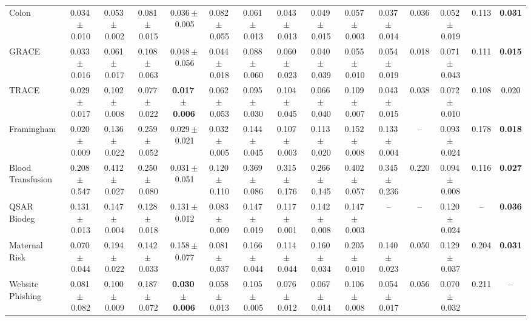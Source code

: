 \documentclass[8pt]{extarticle}
\begin{document}
\begin{longtable}{l*{14}{c}}
Colon & 0.034\,$\pm$\,0.010 & 0.053\,$\pm$\,0.002 & 0.081\,$\pm$\,0.015 & 0.036\,$\pm$\,0.005 & 0.082\,$\pm$\,0.055 & 0.061\,$\pm$\,0.013 & 0.043\,$\pm$\,0.013 & 0.049\,$\pm$\,0.015 & 0.057\,$\pm$\,0.003 & 0.037\,$\pm$\,0.014 & 0.036 & 0.052\,$\pm$\,0.019 & 0.113 & \textbf{0.031} \\
GRACE & 0.033\,$\pm$\,0.016 & 0.061\,$\pm$\,0.017 & 0.108\,$\pm$\,0.063 & 0.048\,$\pm$\,0.056 & 0.044\,$\pm$\,0.018 & 0.088\,$\pm$\,0.060 & 0.060\,$\pm$\,0.023 & 0.040\,$\pm$\,0.039 & 0.055\,$\pm$\,0.010 & 0.054\,$\pm$\,0.019 & 0.018 & 0.071\,$\pm$\,0.043 & 0.111 & \textbf{0.015} \\
TRACE & 0.029\,$\pm$\,0.017 & 0.102\,$\pm$\,0.008 & 0.077\,$\pm$\,0.022 & \textbf{0.017\,$\pm$\,0.006} & 0.062\,$\pm$\,0.053 & 0.095\,$\pm$\,0.030 & 0.104\,$\pm$\,0.045 & 0.066\,$\pm$\,0.040 & 0.109\,$\pm$\,0.007 & 0.043\,$\pm$\,0.015 & 0.038 & 0.072\,$\pm$\,0.010 & 0.108 & 0.020 \\
Framingham & 0.020\,$\pm$\,0.009 & 0.136\,$\pm$\,0.022 & 0.259\,$\pm$\,0.052 & 0.029\,$\pm$\,0.021 & 0.032\,$\pm$\,0.005 & 0.144\,$\pm$\,0.045 & 0.107\,$\pm$\,0.003 & 0.113\,$\pm$\,0.020 & 0.152\,$\pm$\,0.008 & 0.133\,$\pm$\,0.004 & -- & 0.093\,$\pm$\,0.024 & 0.178 & \textbf{0.018} \\
Blood Transfusion & 0.208\,$\pm$\,0.547 & 0.412\,$\pm$\,0.027 & 0.250\,$\pm$\,0.080 & 0.031\,$\pm$\,0.051 & 0.120\,$\pm$\,0.110 & 0.369\,$\pm$\,0.086 & 0.315\,$\pm$\,0.176 & 0.266\,$\pm$\,0.145 & 0.402\,$\pm$\,0.057 & 0.345\,$\pm$\,0.236 & 0.220 & 0.094\,$\pm$\,0.008 & 0.116 & \textbf{0.027} \\
QSAR Biodeg & 0.131\,$\pm$\,0.013 & 0.147\,$\pm$\,0.004 & 0.128\,$\pm$\,0.018 & 0.131\,$\pm$\,0.012 & 0.083\,$\pm$\,0.009 & 0.147\,$\pm$\,0.019 & 0.117\,$\pm$\,0.001 & 0.142\,$\pm$\,0.008 & 0.147\,$\pm$\,0.003 & -- & -- & 0.120\,$\pm$\,0.024 & -- & \textbf{0.036} \\
Maternal Risk & 0.070\,$\pm$\,0.044 & 0.194\,$\pm$\,0.022 & 0.142\,$\pm$\,0.033 & 0.158\,$\pm$\,0.077 & 0.081\,$\pm$\,0.037 & 0.166\,$\pm$\,0.044 & 0.114\,$\pm$\,0.044 & 0.160\,$\pm$\,0.034 & 0.205\,$\pm$\,0.010 & 0.140\,$\pm$\,0.023 & 0.050 & 0.129\,$\pm$\,0.037 & 0.204 & \textbf{0.031} \\
Website Phishing & 0.081\,$\pm$\,0.082 & 0.100\,$\pm$\,0.009 & 0.187\,$\pm$\,0.072 & \textbf{0.030\,$\pm$\,0.006} & 0.058\,$\pm$\,0.013 & 0.105\,$\pm$\,0.005 & 0.076\,$\pm$\,0.012 & 0.067\,$\pm$\,0.014 & 0.106\,$\pm$\,0.008 & 0.054\,$\pm$\,0.017 & 0.056 & 0.070\,$\pm$\,0.032 & 0.211 & -- \\
\end{longtable}
\end{document}
